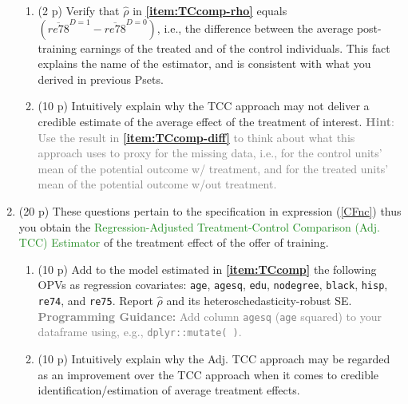 \documentclass{article}
\begin{document}
\begin{enumerate}[label=\textbf{Q\arabic{enumi}}.,ref=Q\arabic{enumi}, wide=0pt, itemsep=0em, topsep=5pt, labelindent=0pt, resume]
\begin{enumerate}
\item (2 p) Verify that $\hat{\rho}$ in \textbf{\ref{item:TCcomp-rho}} equals $(\overline{re78}^{D=1}-\overline{re78}^{D=0})$, i.e., the difference between the average post-training earnings of the treated and of the control individuals. This fact explains the name of the estimator, and is consistent with what you derived in previous Psets.\label{item:TCcomp-diff}

\item (10 p) Intuitively explain why the TCC approach may not deliver a credible estimate of the average effect of the treatment of interest. \textcolor{gray}{\textbf{Hint}: Use the result in  \textbf{\ref{item:TCcomp-diff}} to think about what this approach uses to proxy for the missing data, i.e., for the control units' mean of the potential outcome w/ treatment, and for the treated units' mean of the potential outcome w/out treatment.}
\end{enumerate}


\item (20 p) These questions pertain to the specification in expression (\ref{CFnc}) thus you obtain the \textcolor{ForestGreen}{Regression-Adjusted Treatment-Control Comparison (Adj. TCC) Estimator} of the treatment effect of the offer of training. \label{item:CFnc}

\begin{enumerate}

\item (10 p) Add to the model estimated in \textbf{\ref{item:TCcomp}} the following OPVs as regression covariates: \texttt{age}, \texttt{agesq}, \texttt{edu}, \texttt{nodegree}, \texttt{black}, \texttt{hisp}, \texttt{re74}, and \texttt{re75}. Report $\hat{\rho}$ and its heteroschedasticity-robust SE. \textcolor{gray}{\textbf{Programming Guidance:} Add column \texttt{agesq} (\texttt{age} squared) to your dataframe using, e.g., \texttt{dplyr::mutate( )}.}\label{item:CFnc-rho}

\item (10 p) Intuitively explain why the Adj. TCC approach may be regarded as an improvement over the TCC approach when it comes to credible identification/estimation of average treatment effects.
\end{enumerate}



\end{enumerate}
\end{document}

